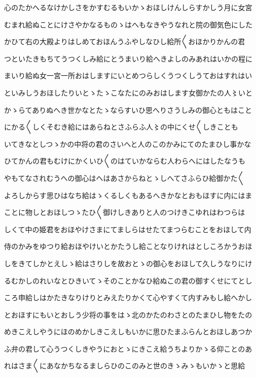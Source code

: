 \documentclass[a4paper,11pt,landscape]{ltjtarticle}
\begin{document}
心のたかへるなけかしさをかすむるもいかゝおほしけんしらすかしう月に女宮
\par\medskip
むまれ給ぬことにけさやかなるものゝはへもなきやうなれと院の御気色にした
\par\medskip
かひて右の大殿よりはしめておほんうふやしなひし給所〱おほかりかんの君
\par\medskip
つといたきもちてうつくしみ給にとうまいり給へきよしのみあれはいかの程に
\par\medskip
まいり給ぬ女一宮一所おはしますにいとめつらしくうつくしうておはすれはい
\par\medskip
といみしうおほしたりいとゝたゝこなたにのみおはします女御かたの人〻いと
\par\medskip
かゝらてありぬへき世かなとたゝならすいひ思へりさうしみの御心ともはこと
\par\medskip
にかる〱しくそむき給にはあらねとさふらふ人〻の中にくせ〱しきことも
\par\medskip
いてきなとしつゝかの中将の君のさいへと人のこのかみにてのたまひし事かな
\par\medskip
ひてかんの君もむけにかくいひ〱のはていかならむ人わらへにはしたなうも
\par\medskip
やもてなされむうへの御心はへはあさからねとゝしへてさふらひ給御かた〱
\par\medskip
よろしからす思ひはなち給はゝくるしくもあるへきかなとおもほすに内にはま
\par\medskip
ことに物しとおほしつゝたひ〱御けしきありと人のつけきこゆれはわつらは
\par\medskip
しくて中の姫君をおほやけさまにてましらはせたてまつらむことをおほして内
\par\medskip
侍のかみをゆつり給おほやけいとかたうし給ことなりけれはとしころかうおほ
\par\medskip
しをきてしかとえしゝ給はさりしを故おとゝの御心をおほして久しうなりにけ
\par\medskip
るむかしのれいなとひきいてゝそのことかなひ給ぬこの君の御すくせにてとし
\par\medskip
ころ申給しはかたきなりけりとみえたりかくて心やすくて内すみもし給へかし
\par\medskip
とおほすにもいとおしう少将の事をはゝ北のかたのわさとのたまひし物をたの
\par\medskip
めきこえしやうにほのめかしきこえしもいかに思ひたまふらんとおほしあつか
\par\medskip
ふ弁の君して心うつくしきやうにおとゝにきこえ給うちよりかゝる仰ことのあ
\par\medskip
れはさま〱にあなかちなるましらひのこのみと世のきゝみゝもいかゝと思給
\end{document}
